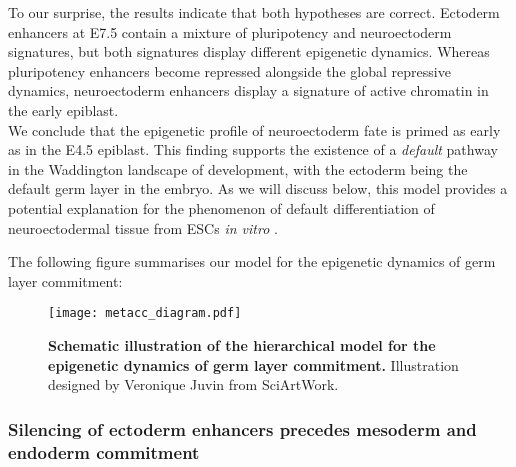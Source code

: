 To our surprise, the results indicate that both hypotheses are correct. Ectoderm enhancers at E7.5 contain a mixture of pluripotency and neuroectoderm signatures, but both signatures display different epigenetic dynamics. Whereas pluripotency enhancers become repressed alongside the global repressive dynamics, neuroectoderm enhancers display a signature of active chromatin in the early epiblast.\\
We conclude that the epigenetic profile of neuroectoderm fate is primed as early as in the E4.5 epiblast. This finding supports the existence of a \textit{default} pathway in the
Waddington landscape of development, with the ectoderm being the default germ layer in the embryo. As we will discuss below, this model provides a potential explanation for the phenomenon of default differentiation of neuroectodermal tissue from ESCs \textit{in vitro} \cite{Munoz2002,Hemmati-Brivanlou1997}.

The following figure summarises our model for the epigenetic dynamics of germ layer commitment:

\begin{figure}[H]
	\centering
	\texttt{[image: metacc\_diagram.pdf]}
	\caption{
	\textbf{Schematic illustration of the hierarchical model for the epigenetic dynamics of germ layer commitment.} Illustration designed by Veronique Juvin from SciArtWork. }
	\label{fig:metacc_diagram}
\end{figure}


\subsubsection{Silencing of ectoderm enhancers precedes mesoderm and endoderm commitment}

